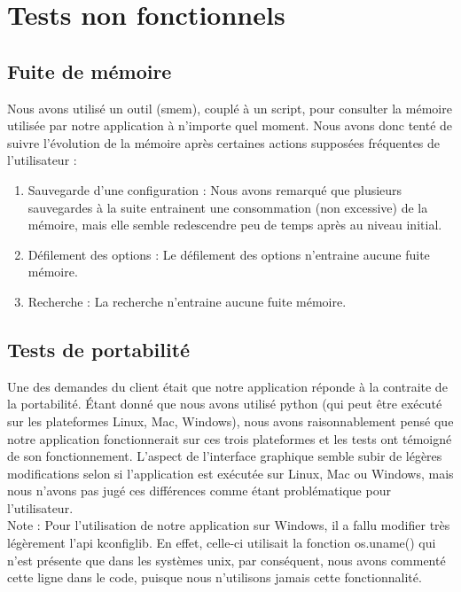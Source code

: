 \documentclass[17pts]{report}
\begin{document}
\section{Tests non fonctionnels}
\label{sec:Tests non fonctionnels}
\subsection{Fuite de mémoire}
\label{sub:Fuite de mémoire}
Nous avons utilisé un outil (smem), couplé à un script, pour consulter la
mémoire utilisée par notre application à n'importe quel moment. Nous avons donc
tenté de suivre l'évolution de la mémoire après certaines actions supposées
fréquentes de l'utilisateur :

\begin{enumerate}
    \item Sauvegarde d'une configuration : Nous avons remarqué que plusieurs
        sauvegardes à la suite entrainent une consommation (non excessive) de
        la mémoire, mais elle semble redescendre peu de temps après au niveau
        initial.
    \item Défilement des options : Le défilement des options n'entraine
          aucune fuite mémoire.
    \item Recherche : La recherche n'entraine aucune fuite mémoire.
\end{enumerate}


\subsection{Tests de portabilité}
\label{sub:Tests de portabilité}

Une des demandes du client était que notre application réponde à la contraite
de la portabilité. Étant donné que nous avons utilisé python (qui peut être
exécuté sur les plateformes Linux, Mac, Windows), nous avons raisonnablement
pensé que notre application fonctionnerait sur ces trois plateformes et les
tests ont témoigné de son fonctionnement. L'aspect de l'interface graphique
semble subir de légères modifications selon si l'application est exécutée sur
Linux, Mac ou Windows, mais nous n'avons pas jugé ces différences comme étant
problématique pour l'utilisateur.\\

Note : Pour l'utilisation de notre application sur Windows, il a fallu modifier
très légèrement l'api kconfiglib. En effet, celle-ci utilisait la fonction
os.uname() qui n'est présente que dans les systèmes unix, par conséquent, nous
avons commenté cette ligne dans le code, puisque nous n'utilisons jamais cette
fonctionnalité.
\end{document}
